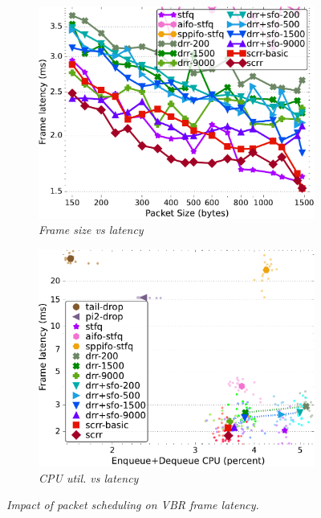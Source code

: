 \begin{figure}[t]
	\centering
 	\begin{subfigure}[t]{.49\linewidth}
		\centering
        \includegraphics[width=1\linewidth]{figs/pkt_size_cn_2t4x16_mn_2ui32_mss_1468_lat_comp_drr_scrr.pdf}
    \caption{\small{\textit{Frame size vs latency}}}
	\label{fig:vbr-latency-sched}
	\end{subfigure}
	\begin{subfigure}[t]{.49\linewidth}
		\centering
    \includegraphics[width=1\linewidth]{figs/pkt_size_cn_2t4x16_mn_2ui32_mss_1468_kp_lat_comp_methods.pdf}
    \caption{\small{\textit{CPU util. vs latency}}}
	\label{fig:vbr-cpu-latency-all}
	\end{subfigure}
 \vspace{-3mm}
    \caption{\small{\textit{Impact of packet scheduling on VBR frame latency.}}}
    \label{fig:vbr-latency}
  \vspace{-0.6cm}
\end{figure}
